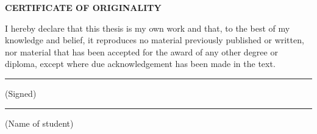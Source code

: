 \thispagestyle{empty}
\begin{center}
  \vspace*{12mm}
  {\Large\rmfamily\bfseries CERTIFICATE OF ORIGINALITY\par}
\end{center}

\vspace{18mm}

I hereby declare that this thesis is my own work and that, to the best of my knowledge and belief, it reproduces no material previously published or written, nor material that has been accepted for the award of any other degree or diploma, except where due acknowledgement has been made in the text.

\vspace{24mm}

\noindent
\begin{minipage}[t]{0.42\textwidth}
  \centering
  \studentsignature\par
  \vspace{1mm}\hrule
  \vspace{1mm}(Signed)
\end{minipage}
\hfill
\begin{minipage}[t]{0.42\textwidth}
  \centering
  \rule{0pt}{16mm}\studentname\par
  \vspace{1mm}\hrule
  \vspace{1mm}(Name of student)
\end{minipage}

\clearpage
